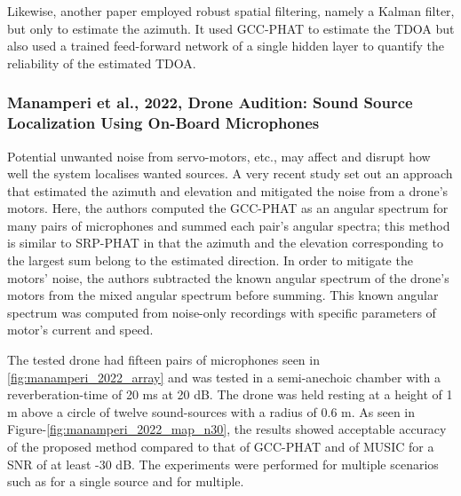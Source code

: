 \documentclass[notitlepage]{report}
\begin{document}
Likewise, another paper \cite{kim_robust_2008} employed robust spatial filtering, namely a Kalman filter, but only to estimate the azimuth. It used GCC-PHAT to estimate the TDOA but also used a trained feed-forward network of a single hidden layer to quantify the reliability of the estimated TDOA.

\subsubsection{Manamperi et al., 2022, Drone Audition: Sound Source Localization Using On-Board Microphones}

Potential unwanted noise from servo-motors, etc., may affect and disrupt how well the system localises wanted sources. A very recent study \cite{manamperi_drone_2022} set out an approach that estimated the azimuth and elevation and mitigated the noise from a drone's motors. Here, the authors computed the GCC-PHAT as an angular spectrum for many pairs of microphones and summed each pair's angular spectra; this method is similar to SRP-PHAT in that the azimuth and the elevation corresponding to the largest sum belong to the estimated direction. In order to mitigate the motors' noise, the authors subtracted the known angular spectrum of the drone's motors from the mixed angular spectrum before summing. This known angular spectrum was computed from noise-only recordings with specific parameters of motor's current and speed. 

The tested drone had fifteen pairs of microphones seen in \ref{fig:manamperi_2022_array} and was tested in a semi-anechoic chamber with a reverberation-time of 20 \si{ms} at 20 \si{dB}. The drone was held resting at a height of 1 \si{m} above a circle of twelve sound-sources with a radius of 0.6 \si{m}. As seen in Figure-\ref{fig:manamperi_2022_map_n30}, the results showed acceptable accuracy of the proposed method compared to that of GCC-PHAT and of MUSIC for a SNR of at least -30 \si{dB}. The experiments were performed for multiple scenarios such as for a single source and for multiple.
\end{document}
